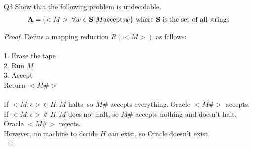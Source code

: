 \begin{problem}
    {Q3}
    Show that the following problem is undecidable. \\
    \begin{align*}
        \textbf{A} = \{<M> | \forall w \in \textbf{S}~M \text{accepts} w\} \text{ where \textbf{S} is the set of all strings}
    \end{align*}
    \begin{proof}
        Define a mapping reduction $R(<M>)$ as follows: \\\\
        1. Erase the tape \\
        2. Run $M$ \\
        3. Accept \\
        Return $<M\#>$ \\\\
        If $<M, \epsilon> \in H: M$ halts, so $M\#$ accepts everything. Oracle $<M\#>$ accepts. \\
        If $<M, \epsilon> \not\in H: M$ does not halt, so $M\#$ accepts nothing and doesn't halt. Oracle $<M\#>$ rejects. \\
        However, no machine to decide $H$ can exist, so Oracle doesn't exist. \\
    \end{proof}
\end{problem}
